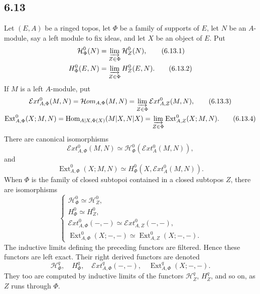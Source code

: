 \documentclass[11pt]{article}
\newcommand{\Hh}{\mathcal{H}}
\newcommand{\Hom}{\operatorname{Hom}}
\newcommand{\Ext}{\operatorname{Ext}}
\newcommand{\Hhom}{\mathcal{H}om}
\newcommand{\Eext}{\mathcal{E}xt}
\begin{document}
\subsection*{6.13}
Let $(E,A)$ be a ringed topos, let $\Phi$ be a family of supports of $E$, let $N$ be an $A$-module, say a left module to fix ideas, and let $X$ be an object of $E$. Put
\begin{align*}
        \Hh_\Phi^0(N)&=\varinjlim_{Z\in\Phi}\Hh_Z^0(N),\tag{6.13.1}\\
        H_\Phi^0(E,N)&=\varinjlim_{Z\in\Phi}H_Z^0(E,N).\tag{6.13.2}
\end{align*}
If $M$ is a left $A$-module, put
\begin{gather*}
        \Eext_{A,\Phi}^0(M,N)=\Hhom_{A,\Phi}(M,N)=\varinjlim_{Z\in\Phi}\Eext_{A,Z}^0(M,N),\tag{6.13.3}\\
        \Ext_{A,\Phi}^0(X;M,N)=\Hom_{A|X,\Phi(X)}(M|X,N|X)=\varinjlim_{Z\in\Phi}\Ext_{A,Z}^0(X;M,N).\tag{6.13.4}
\end{gather*}
There are canonical isomorphisms
\begin{equation*}
        \Eext_{A,\Phi}^0(M,N)\simeq \Hh_\Phi^0(\Eext_A^0(M,N)),\tag{6.13.5}
\end{equation*}
and
\begin{equation*}
        \Ext_{A,\Phi}^0(X;M,N)\simeq H_\Phi^0(X,\Eext_A^0(M,N)).\tag{6.13.6}
\end{equation*}
When $\Phi$ is the family of closed subtopoi contained in a closed subtopos $Z$, there are isomorphisms
\begin{equation*}
\begin{cases}
\Hh_\Phi^0\simeq \Hh_Z^0,\\
H_\Phi^0\simeq H_Z^0,\\
\Eext_{A,\Phi}^0(-,-)\simeq \Eext_{A,Z}^0(-,-),\\
\Ext_{A,\Phi}^0(X;-,-)\simeq \Ext_{A,Z}^0(X;-,-).
\end{cases}\tag{6.13.7}
\end{equation*}
The inductive limits defining the preceding functors are filtered. Hence these functors are left exact. Their right derived functors are denoted
\begin{equation*}
        \Hh_\Phi^q,
        \quad H_\Phi^q,
        \quad \Eext_{A,\Phi}^q(-,-),
        \quad \Ext_{A,\Phi}^q(X;-,-).\tag{6.13.8}
\end{equation*}
They too are computed by inductive limits of the functors $\Hh_Z^q$, $H_Z^q$, and so on, as $Z$ runs through $\Phi$.
\end{document}
